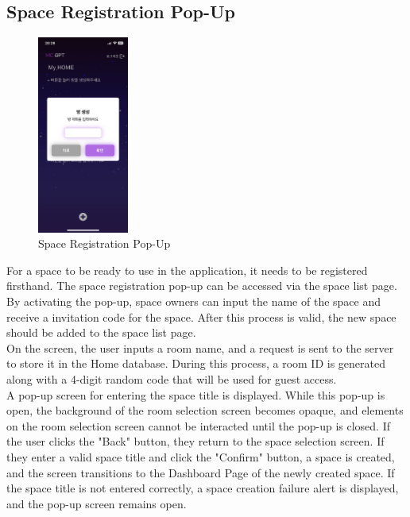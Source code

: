 \documentclass[conference]{IEEEtran}
\begin{document}
    \subsection{Space Registration Pop-Up}
        \begin{figure}[htbp]
            \centerline{\includegraphics[width=3cm]{Images/screen/space/2_SPACE_POPUP1.PNG}}
            \caption{Space Registration Pop-Up}
            \label{fig}
        \end{figure}
        For a space to be ready to use in the application, it needs to be registered firsthand. The space registration pop-up can be accessed via the space list page. By activating the pop-up, space owners can input the name of the space and receive a invitation code for the space. After this process is valid, the new space should be added to the space list page.\\
        On the screen, the user inputs a room name, and a request is sent to the server to store it in the Home database. During this process, a room ID is generated along with a 4-digit random code that will be used for guest access. \\
        A pop-up screen for entering the space title is displayed. While this pop-up is open, the background of the room selection screen becomes opaque, and elements on the room selection screen cannot be interacted until the pop-up is closed. If the user clicks the "Back" button, they return to the space selection screen. If they enter a valid space title and click the "Confirm" button, a space is created, and the screen transitions to the Dashboard Page of the newly created space. If the space title is not entered correctly, a space creation failure alert is displayed, and the pop-up screen remains open.
\end{document}
